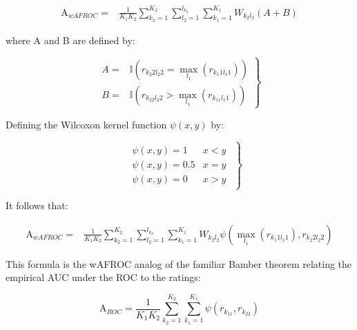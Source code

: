 \documentclass[
]{book}
\begin{document}
\begin{equation}
\begin{aligned}
\text{A}_{wAFROC} =& \frac{1}{K_1K_2}  \sum_{k_2=1}^{K_2} \sum_{l_2=1}^{l_{k_2}}\sum_{k_1=1}^{K_1} W_{k_2l_2} \left( A+B \right)
\end{aligned}
\label{eq:empirical-theorem6}
\end{equation}

where A and B are defined by:

\begin{equation}
\left. 
\begin{aligned}
A =& \mathbb{I}\left ( r_{k_2 2l_2 2} = \max_{l_1} \left (r_{k_1 1l_1 1}  \right )  \right ) \\
B =& \mathbb{I}\left ( r_{k_22 l_2 2} > \max_{l_1} \left (r_{k_11 l_1 1}  \right )  \right )  
\end{aligned}
\right \} 
\label{eq:empirical-theorem6a}
\end{equation}

Defining the Wilcoxon kernel function \(\psi(x,y)\) by:

\begin{equation}
\left. 
\begin{matrix}
\begin{aligned}
&\psi\left( x,y \right) = 1 &  x < y\\
&\psi\left( x,y \right) = 0.5  & x = y \\
&\psi\left( x,y \right) = 0  & x > y
\end{aligned}
\end{matrix}
\right \} 
\label{eq:empirical-wilcoxon-kernel}
\end{equation}

It follows that:

\begin{equation}
\begin{aligned}
\text{A}_{wAFROC} =& \frac{1}{K_1K_2}  \sum_{k_2=1}^{K_2} \sum_{l_2=1}^{l_{k_2}}\sum_{k_1=1}^{K_1} W_{k_2l_2} \psi\left ( \max_{l_1} \left ( r_{k_1 1 l_1 1} \right ) , r_{k_2 2 l_2 2} \right )
\end{aligned}
\label{eq:empirical-theorem7}
\end{equation}

This formula is the wAFROC analog of the familiar Bamber theorem \citep{bamber1975area} relating the empirical AUC under the ROC to the ratings:

\begin{equation}
\text{A}_{ROC} = \frac{1}{K_1K_2}  \sum_{k_2=1}^{K_2} \sum_{k_1=1}^{K_1} \psi\left (  r_{k_11} , r_{k_22} \right )
\label{eq:empirical-bamber-theorem}
\end{equation}
\end{document}
